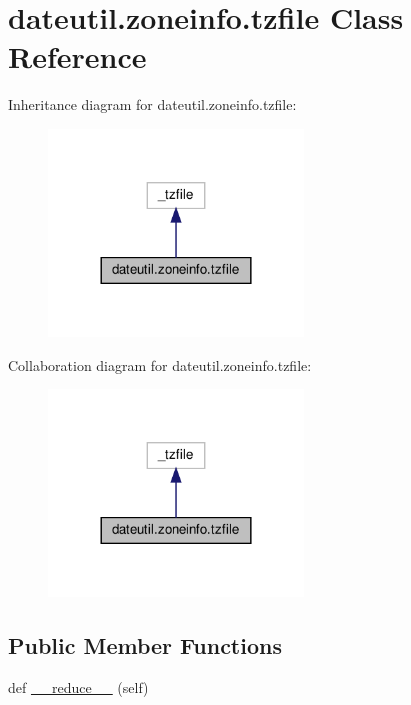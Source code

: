 \hypertarget{classdateutil_1_1zoneinfo_1_1tzfile}{}\section{dateutil.\+zoneinfo.\+tzfile Class Reference}
\label{classdateutil_1_1zoneinfo_1_1tzfile}


Inheritance diagram for dateutil.\+zoneinfo.\+tzfile\+:
\nopagebreak
\begin{figure}[H]
\begin{center}
\leavevmode
\includegraphics[width=192pt]{classdateutil_1_1zoneinfo_1_1tzfile__inherit__graph}
\end{center}
\end{figure}


Collaboration diagram for dateutil.\+zoneinfo.\+tzfile\+:
\nopagebreak
\begin{figure}[H]
\begin{center}
\leavevmode
\includegraphics[width=192pt]{classdateutil_1_1zoneinfo_1_1tzfile__coll__graph}
\end{center}
\end{figure}
\subsection*{Public Member Functions}
\begin{DoxyCompactItemize}
\item 
def \hyperlink{classdateutil_1_1zoneinfo_1_1tzfile_a916497cc0df42d9d4f1f3b06b490690f}{\+\_\+\+\_\+reduce\+\_\+\+\_\+} (self)
\end{DoxyCompactItemize}



